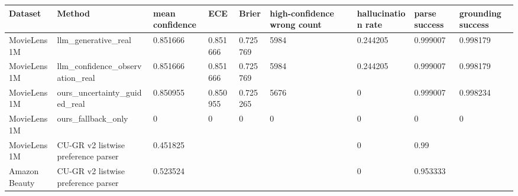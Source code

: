 \begin{tabular}{lllllllll}
\toprule
Dataset & Method & mean confidence & ECE & Brier & high-confidence wrong count & hallucination rate & parse success & grounding success \\
\midrule
MovieLens 1M & llm\_generative\_real & 0.851666 & 0.851666 & 0.725769 & 5984 & 0.244205 & 0.999007 & 0.998179 \\
MovieLens 1M & llm\_confidence\_observation\_real & 0.851666 & 0.851666 & 0.725769 & 5984 & 0.244205 & 0.999007 & 0.998179 \\
MovieLens 1M & ours\_uncertainty\_guided\_real & 0.850955 & 0.850955 & 0.725265 & 5676 & 0 & 0.999007 & 0.998234 \\
MovieLens 1M & ours\_fallback\_only & 0 & 0 & 0 & 0 & 0 & 0 & 0 \\
MovieLens 1M & CU-GR v2 listwise preference parser & 0.451825 &  &  &  & 0 & 0.99 &  \\
Amazon Beauty & CU-GR v2 listwise preference parser & 0.523524 &  &  &  & 0 & 0.953333 &  \\
\bottomrule
\end{tabular}
